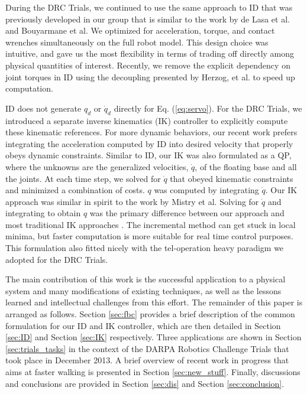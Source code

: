 \documentclass{ws-ijhr}
\newcommand{\eref}[1] {Eq. (\ref{#1})}
\newcommand{\sref}[1] {Section \ref{#1}}
\begin{document}
During the DRC Trials, we continued to use the same approach to ID that was 
previously developed in our group \cite{stephens_thesis,whitman_thesis,sfeng_online} 
that is similar to the work by de Lasa et al. \cite{deLasa_hir} and 
Bouyarmane et al. \cite{bouyarmane_vrc} 
We optimized for acceleration, torque, and contact wrenches simultaneously 
on the full robot model. This design choice was intuitive, and gave us the
most flexibility in terms of trading off directly among physical quantities
of interest. Recently, we remove the explicit dependency on joint torques in
ID using the decoupling presented by Herzog, et al. \cite{alex_hir} to speed
up computation.

ID does not generate $q_d$ or $\dot{q}_d$ directly for \eref{eq:servo}.
For the DRC Trials, we introduced a separate inverse kinematics (IK) controller to
explicitly compute these kinematic references. 
For more dynamic behaviors, our recent work prefers integrating the acceleration
computed by ID into desired velocity that properly obeys dynamic constraints.  
Similar to ID, our IK was also formulated as a QP, where the unknowns are the 
generalized velocities, $\dot{q}$, of the floating base and all the joints. 
At each time step, we solved for $\dot{q}$ that obeyed kinematic constraints 
and minimized a combination of costs. $q$ was computed by integrating $\dot{q}$. 
Our IK approach was similar in spirit to the work by Mistry et al.\cite{mistry_ik} 
Solving for $\dot{q}$ and integrating to obtain $q$ was the primary difference
between our approach and most traditional IK approaches \cite{kajita03,asimo}. 
The incremental method can get stuck in local minima, but faster computation
is more suitable for real time control purposes. 
This formulation also fitted nicely with the tel-operation heavy paradigm we 
adopted for the DRC Trials. 

The main contribution of this work is the successful application to a physical 
system and many modifications of existing techniques, as well as 
the lessons learned and intellectual challenges from this effort. 
The remainder of this paper is arranged as follows. 
\sref{sec:fbc} provides a brief description of the common formulation for 
our ID and IK controller, which are then detailed in \sref{sec:ID} and \sref{sec:IK}
respectively.
Three applications are shown in \sref{sec:trials_tasks} 
in the context of the DARPA Robotics Challenge Trials that took place in 
December 2013. 
A brief overview of recent work in progress that aims at faster walking 
is presented in \sref{sec:new_stuff}.
Finally, discussions and conclusions are provided 
in \sref{sec:dis} and \sref{sec:conclusion}.
\end{document}
